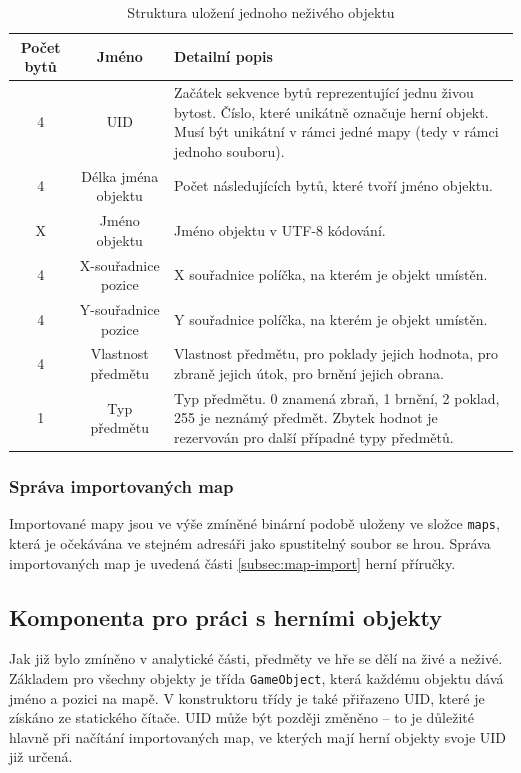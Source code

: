 \documentclass[11pt,a4paper]{scrartcl}
\begin{document}
	\begin{table}[H]
		\centering
		\begin{tabular}{|c|c|p{8cm}|}
			\hline
			Počet bytů & Jméno & Detailní popis \\
			\hline
			\hline
			4 & UID & Začátek sekvence bytů reprezentující jednu živou bytost. Číslo, které unikátně označuje herní objekt. Musí být unikátní v rámci jedné mapy (tedy v rámci jednoho souboru). \\
			\hline
			4 & Délka jména objektu & Počet následujících bytů, které tvoří jméno objektu. \\
			\hline
			X & Jméno objektu & Jméno objektu v UTF-8 kódování. \\
			\hline
			4 & X-souřadnice pozice & X souřadnice políčka, na kterém je objekt umístěn. \\
			\hline
			4 & Y-souřadnice pozice & Y souřadnice políčka, na kterém je objekt umístěn. \\
			\hline
			4 & Vlastnost předmětu & Vlastnost předmětu, pro poklady jejich hodnota, pro zbraně jejich útok, pro brnění jejich obrana. \\
			\hline
			1 & Typ předmětu & Typ předmětu. 0 znamená zbraň, 1 brnění, 2 poklad, 255 je neznámý předmět. Zbytek hodnot je rezervován pro další případné typy předmětů. \\
			\hline
		\end{tabular}
		\caption{Struktura uložení jednoho neživého objektu}
		\label{tab:bin-item}
	\end{table}
	
	\subsubsection{Správa importovaných map}
	Importované mapy jsou ve výše zmíněné binární podobě uloženy ve složce \verb|maps|, která je očekávána ve stejném adresáři jako spustitelný soubor se hrou. Správa importovaných map je uvedená části \ref{subsec:map-import} herní příručky. 
	
	\subsection{Komponenta pro práci s herními objekty}
	Jak již bylo zmíněno v analytické části, předměty ve hře se dělí na živé a neživé. Základem pro všechny objekty je třída \verb|GameObject|, která každému objektu dává jméno a pozici na mapě. V konstruktoru třídy je také přiřazeno UID, které je získáno ze statického čítače. UID může být později změněno -- to je důležité hlavně při načítání importovaných map, ve kterých mají herní objekty svoje UID již určená.
	
\end{document}
